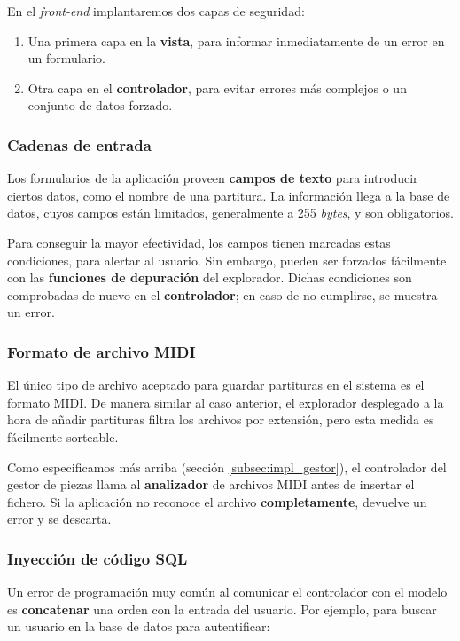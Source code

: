 En el \textit{front-end} implantaremos dos capas de seguridad:

\begin{enumerate}
	\item Una primera capa en la \textbf{vista}, para informar inmediatamente de un error en un formulario.
	\item Otra capa en el \textbf{controlador}, para evitar errores más complejos o un conjunto de datos forzado.
\end{enumerate}

\subsubsection{Cadenas de entrada}

Los formularios de la aplicación proveen \textbf{campos de texto} para introducir ciertos datos, como el nombre de una partitura. La información llega a la base de datos, cuyos campos están limitados, generalmente a 255 \textit{bytes}, y son obligatorios.

Para conseguir la mayor efectividad, los campos  tienen marcadas estas condiciones, para alertar al usuario. Sin embargo, pueden ser forzados fácilmente con las \textbf{funciones de depuración} del explorador. Dichas condiciones son comprobadas de nuevo en el \textbf{controlador}; en caso de no cumplirse, se muestra un error.

\subsubsection{Formato de archivo MIDI}

El único tipo de archivo aceptado para guardar partituras en el sistema es el formato \acrshort{MIDI}. De manera similar al caso anterior, el explorador desplegado a la hora de añadir partituras filtra los archivos por extensión, pero esta medida es fácilmente sorteable.

Como especificamos más arriba (sección \ref{subsec:impl_gestor}), el controlador del gestor de piezas llama al \textbf{analizador} de archivos \acrshort{MIDI} antes de insertar el fichero. Si la aplicación no reconoce el archivo \textbf{completamente}, devuelve un error y se descarta.

\subsubsection{Inyección de código SQL}

Un error de programación muy común al comunicar el controlador con el modelo es \textbf{concatenar} una orden con la entrada del usuario. Por ejemplo, para buscar un usuario en la base de datos para autentificar:

